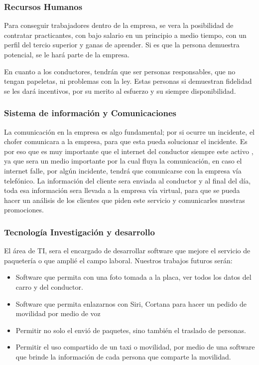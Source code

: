 \subsubsection{Recursos Humanos}
Para conseguir trabajadores dentro de la empresa, se vera la posibilidad de contratar practicantes, con bajo salario en un principio a medio tiempo, con un perfil del tercio superior y ganas de aprender. Si es que la persona demuestra potencial, se le hará parte de la empresa.

En cuanto a los conductores, tendrán que ser personas responsables, que no tengan papeletas, ni problemas con la ley. Estas personas si demuestran fidelidad se les dará incentivos, por su merito al esfuerzo y su siempre disponibilidad.

\subsubsection{Sistema de información y Comunicaciones}
La comunicación en la empresa es algo fundamental; por si ocurre un incidente, el chofer comunicara a la empresa, para que esta pueda solucionar el incidente. Es por eso que es muy importante que el internet del conductor siempre este activo , ya que sera un medio importante por la cual fluya la comunicación, en caso el internet falle, por algún incidente, tendrá que comunicarse con la empresa vía telefónico.
La información del cliente sera enviada al conductor y al final del día, toda esa información sera llevada a la empresa vía virtual, para que se pueda hacer un análisis de los clientes que piden este servicio y comunicarles nuestras promociones.


\subsubsection{Tecnología Investigación y desarrollo}
El área de TI, sera el encargado de desarrollar software que mejore el servicio de paquetería o que amplié el campo laboral. Nuestros trabajos futuros serán:
\begin{itemize}
\item Software que permita con una foto tomada a la placa, ver todos los datos del carro y del conductor.
\item Software que permita enlazarnos con Siri, Cortana para hacer un pedido de movilidad por medio de voz
\item Permitir no solo el envió de paquetes, sino también el traslado de personas.
\item Permitir el uso compartido de un taxi o movilidad, por medio de una software que brinde la información de cada persona que comparte la movilidad.
\end{itemize}


